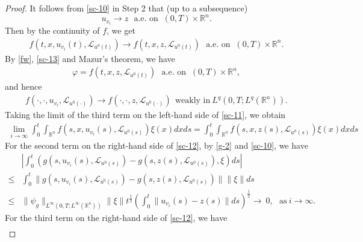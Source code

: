 \documentclass[10pt,a4paper]{amsart}
\def\leq{\leqslant}
\begin{document}
\begin{proof}
    It follows from \eqref{sc-10} in Step 2 that (up to a subsequence)
    $$u_{v_i}  \rightarrow  z \ \ \   \text{a.e. on }  \ (0,T) \times \mathbb{R}^n.$$
    Then by the continuity of $f$, we get
    \begin{align} \label{sc-13}
        f(t, x, u_{v_i}(t), \mathcal{L}_{u^0(t)} )  \rightarrow  f(t, x, z, \mathcal{L}_{u^0(t)} )\ \ \
        \text{a.e. on } \  (0,T) \times \mathbb{R}^n.
    \end{align}
    By \eqref{fw}, \eqref{sc-13} and Mazur's theorem, we have
    \begin{align} \label{sc-14}
        \varphi = f(t, x, z, \mathcal{L}_{u^0(t)})  \ \ \  \text{a.e. on } \  (0,T) \times \mathbb{R}^n,
    \end{align}
    and hence
    \begin{align} \label{sc-15}
        f(\cdot, \cdot, u_{v_i}, \mathcal{L}_{u^0(\cdot)} ) \rightarrow f(\cdot, \cdot, z, \mathcal{L}_{u^0(\cdot)} )
        \ \  \text{weakly in} \  L^q(0,T; L^q(\mathbb{R}^n) ).
    \end{align}
    Taking the limit
    of the third term on the left-hand side of \eqref{sc-11},
    we obtain
    \begin{align} \label{sc-16}
        \lim_{i \to   \infty} \int_0^t \int_{\mathbb{R}^n} f( s, x, u_{v_i}(s), \mathcal{L}_{u^0(s)}) \xi(x) dx ds
        = \int_0^t \int_{\mathbb{R}^n} f( s, x, z(s), \mathcal{L}_{u^0(s)} ) \xi(x) dx ds
    \end{align}
    For the second term on the right-hand side of \eqref{sc-12},
    by \eqref{g-2} and \eqref{sc-10}, we have
    \begin{align} \label{sc-17}
        &
        \left |
        \int_0^t \left( g(s, u_{v_i}(s), \mathcal{L}_{u^0(s)} ) - g(s, z(s), \mathcal{L}_{u^0(s)} ), \xi \right) ds
        \right |
        \nonumber \\
        \leq & \int_0^t
        \| g(s, u_{v_i}(s), \mathcal{L}_{u^0(s)} ) - g(s, z(s), \mathcal{L}_{u^0(s)} ) \|
        \| \xi \|
        ds  \nonumber \\
        \leq & \| \psi_g \|_{L^\infty(0,T; L^\infty(\mathbb{R}^n) ) }
        \| \xi \|
        t^{\frac{1}{2}}
        \left( \int_0^t
        \| u_{v_i}(s) - z(s) \|
        ds
        \right)^{\frac{1}{2}}
        \rightarrow   \ 0, \ \ \  \text{as} \  i \to  \infty.
    \end{align}
    For the third term on the right-hand side of \eqref{sc-12}, we have
    \begin{align} \label{sc-18}

\end{align}
\end{proof}
\end{document}
